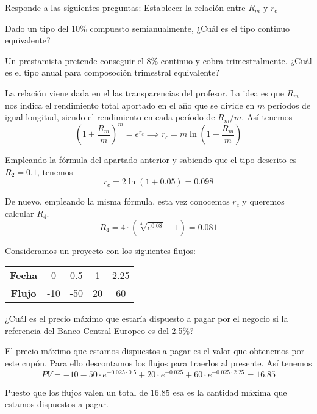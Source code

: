 \begin{problem}[4]
Responde a las siguientes preguntas:
\ppart Establecer la relación entre $R_m$ y $r_c$

\ppart Dado un tipo del 10\% compuesto semianualmente, ¿Cuál es el tipo continuo equivalente?

\ppart Un prestamista pretende conseguir el 8\% continuo y cobra trimestralmente. ¿Cuál es el tipo anual para composoción trimestral equivalente?

\solution

\spart

La relación viene dada en el las transparencias del profesor. La idea es que $R_m$ nos indica el rendimiento total aportado en el año que se divide en $m$ períodos de igual longitud, siendo el rendimiento en cada período de $R_m/m$. Así tenemos
\[\left(1+\frac{R_m}{m}\right)^{m}=e^{r_c} \implies r_c = m \ln\left( 1+\frac{R_m}{m}\right)\]

\spart Empleando la fórmula del apartado anterior y sabiendo que el tipo descrito es $R_2=0.1$, tenemos
\[r_c = 2 \ln\left( 1+0.05\right) = 0.098\]

\spart De nuevo, empleando la misma fórmula, esta vez conocemos $r_c$ y queremos calcular $R_4$.
\[R_4 = 4\cdot \left(\sqrt[4]{e^{0.08}}-1\right) = 0.081\]

\end{problem}

\begin{problem}[5]
Consideramos un proyecto con los siguientes flujos:

\begin{center}
\begin{tabular}{|c|c|c|c|c|}
\hline
\textbf{Fecha} & 0 & 0.5 & 1 & 2.25 \\
\textbf{Flujo} & -10 & -50 & 20 & 60 \\
\hline
\end{tabular}
\end{center}

¿Cuál es el precio máximo que estaría dispuesto a pagar por el negocio si la referencia del Banco Central Europeo es del 2.5\%?

\solution

El precio máximo que estamos dispuestos a pagar es el valor que obtenemos por este cupón. Para ello descontamos los flujos para traerlos al presente. Así tenemos
\[PV = -10 -50\cdot e^{-0.025\cdot 0.5} + 20 \cdot e^{-0.025} + 60\cdot e^{-0.025\cdot 2.25} = 16.85\]

Puesto que los flujos valen un total de $16.85$ esa es la cantidad máxima que estamos dispuestos a pagar.
\end{problem}


